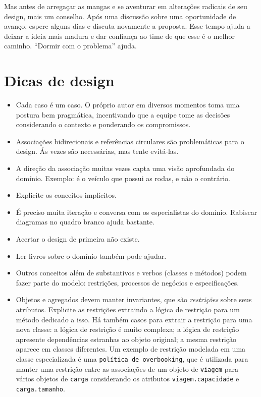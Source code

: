 \documentclass[a4paper, 12pt]{article}
\newcommand{\code}[1]{\texttt{#1}}
\begin{document}
Mas antes de arregaçar as mangas e se aventurar em alterações radicais de seu design, mais um conselho. Após uma discussão sobre uma oportunidade de avanço, espere alguns dias e discuta novamente a proposta. Esse tempo ajuda a deixar a ideia mais madura e dar confiança ao time de que esse é o melhor caminho. ``Dormir com o problema'' ajuda.


\section{Dicas de design}

\begin{itemize}

\item Cada caso é um caso. O próprio autor em diversos momentos toma uma postura bem pragmática, incentivando que a equipe tome as decisões considerando o contexto e ponderando os compromissos.

\item Associações bidirecionais e referências circulares são problemáticas para o design. Ás vezes são necessárias, mas tente evitá-las.

\item A direção da associação muitas vezes capta uma visão aprofundada do domínio. Exemplo: é o veículo que possui as rodas, e não o contrário.

\item Explicite os conceitos implícitos.

\item É preciso muita iteração e conversa com os especialistas do domínio. Rabiscar diagramas no quadro branco ajuda bastante. 

\item Acertar o design de primeira não existe.

\item Ler livros sobre o domínio também pode ajudar.

\item Outros conceitos além de substantivos e verbos (classes e métodos) podem fazer parte do modelo: restrições, processos de negócios e especificações.

\item Objetos e agregados devem manter invariantes, que são \emph{restrições} sobre seus atributos. Explicite as restrições extraindo a lógica de restrição para um método dedicado a isso. Há também casos para extrair a restrição para uma nova classe: a lógica de restrição é muito complexa; a lógica de restrição apresente dependências estranhas ao objeto original; a mesma restrição aparece em classes diferentes. Um exemplo de restrição modelada em uma classe especializada é uma \code{política de overbooking}, que é utilizada para manter uma restrição entre as associações de um objeto de \code{viagem} para vários objetos de \code{carga} considerando os atributos \code{viagem.capacidade} e \code{carga.tamanho}.


\end{itemize}
\end{document}
